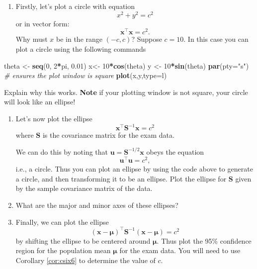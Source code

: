 \documentclass[
]{book}
\newenvironment{Shaded}{\begin{snugshade}}{\end{snugshade}}
\newcommand{\AttributeTok}[1]{\textcolor[rgb]{0.13,0.29,0.53}{#1}}
\newcommand{\CommentTok}[1]{\textcolor[rgb]{0.56,0.35,0.01}{\textit{#1}}}
\newcommand{\DecValTok}[1]{\textcolor[rgb]{0.00,0.00,0.81}{#1}}
\newcommand{\FloatTok}[1]{\textcolor[rgb]{0.00,0.00,0.81}{#1}}
\newcommand{\FunctionTok}[1]{\textcolor[rgb]{0.13,0.29,0.53}{\textbf{#1}}}
\newcommand{\NormalTok}[1]{#1}
\newcommand{\OtherTok}[1]{\textcolor[rgb]{0.56,0.35,0.01}{#1}}
\newcommand{\SpecialCharTok}[1]{\textcolor[rgb]{0.81,0.36,0.00}{\textbf{#1}}}
\newcommand{\StringTok}[1]{\textcolor[rgb]{0.31,0.60,0.02}{#1}}
\providecommand{\tightlist}{%
  \setlength{\itemsep}{0pt}\setlength{\parskip}{0pt}}
\theoremstyle{definition}
\theoremstyle{definition}
\theoremstyle{definition}
\theoremstyle{definition}
\theoremstyle{remark}
\begin{document}
\begin{enumerate}
\def\labelenumi{\roman{enumi}.}
\tightlist
\item
  Firstly, let's plot a circle with equation
  \[x^2+y^2=c^2\]
  or in vector form:
  \[\mathbf x^\top\mathbf x=c^2.\]
  Why must \(x\) be in the range \((-c,c)\)? Suppose \(c=10\). In this case you can plot a circle using the following commands
\end{enumerate}

\begin{Shaded}
\begin{Highlighting}[]
\NormalTok{theta }\OtherTok{\textless{}{-}} \FunctionTok{seq}\NormalTok{(}\DecValTok{0}\NormalTok{, }\DecValTok{2}\SpecialCharTok{*}\NormalTok{pi, }\FloatTok{0.01}\NormalTok{)}
\NormalTok{x}\OtherTok{\textless{}{-}} \DecValTok{10}\SpecialCharTok{*}\FunctionTok{cos}\NormalTok{(theta)}
\NormalTok{y }\OtherTok{\textless{}{-}} \DecValTok{10}\SpecialCharTok{*}\FunctionTok{sin}\NormalTok{(theta)}
\FunctionTok{par}\NormalTok{(}\AttributeTok{pty=}\StringTok{"s"}\NormalTok{)  }\CommentTok{\# ensures the plot window is square}
\FunctionTok{plot}\NormalTok{(x,y,}\AttributeTok{type=}\StringTok{\textquotesingle{}l\textquotesingle{}}\NormalTok{)}
\end{Highlighting}
\end{Shaded}

Explain why this works. \textbf{Note} if your plotting window is not square, your circle will look like an ellipse!

\begin{enumerate}
\def\labelenumi{\roman{enumi}.}
\setcounter{enumi}{1}
\item
  Let's now plot the ellipse
  \[\mathbf x^\top \mathbf S^{-1}\mathbf x=c^2\]
  where \(\mathbf S\) is the covariance matrix for the exam data.

  We can do this by noting that \(\mathbf u= \mathbf S^{-1/2}\mathbf x\) obeys the equation
  \[\mathbf u^\top\mathbf u=c^2,\]
  i.e., a circle. Thus you can plot an ellipse by using the code above to generate a circle, and then transforming it to be an ellipse. Plot the ellipse for \(\mathbf S\) given by the sample covariance matrix of the data.
\item
  What are the major and minor axes of these ellipses?
\item
  Finally, we can plot the ellipse
  \[(\mathbf x-{\boldsymbol{\mu}})^\top \mathbf S^{-1}(\mathbf x-{\boldsymbol{\mu}})=c^2\]
  by shifting the ellipse to be centered around \({\boldsymbol{\mu}}\). Thus plot the 95\% confidence region for the population mean \({\boldsymbol{\mu}}\) for the exam data. You will need to use Corollary \ref{cor:csix6} to determine the value of \(c\).
\end{enumerate}
\end{document}
